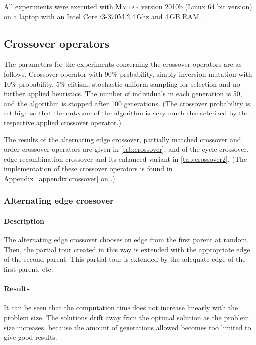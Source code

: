 ﻿\documentclass[a4paper,english,11pt,]{scrartcl}
\begin{document}
All experiments were executed with \textsc{Matlab} version 2010b (Linux 64 bit version) on a laptop with an Intel Core i3-370M 2.4\,Ghz and 4\,GB RAM.

\subsection{Crossover operators}

The parameters for the experiments concerning the crossover operators are as follows. Crossover operator with 90\% probability, simply inversion mutation with 10\% probability, 5\% elitism, stochastic uniform sampling for selection and no further applied heuristics. 
The number of individuals in each generation is 50, and the algorithm is stopped after 100 generations. 
(The crossover probability is set high so that the outcome of the algorithm is very much characterized by the respective applied crossover operator.)


The results of the alternating edge crossover, partially matched crossover and order crossover operators are given in \autoref{tab:crossover}, and of the cycle crossover, edge recombination crossover and its enhanced variant in \autoref{tab:crossover2}.
(The implementation of these crossover operators is found in Appendix~\ref{appendix:crossover} on .)
\subsubsection{Alternating edge crossover}
\paragraph{Description}
The alternating edge crossover chooses an edge from the first
parent at random. Then, the partial tour created in this way is extended
with the appropriate edge of the second parent. This partial tour is
extended by the adequate edge of the first parent, etc.

\paragraph{Results}
It can be seen that the computation time does not increase linearly with the problem size.  The solutions drift away from the optimal solution as the problem size increases, because the amount of generations allowed becomes too limited to give good results. 
% 
\end{document}
